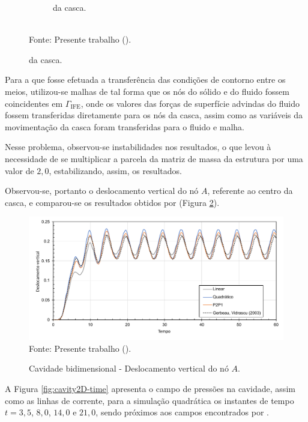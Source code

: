 \begin{figure}[h!]
\begin{subfigure}[b]{0.32\textwidth}
        \caption{da casca.}
    \end{subfigure}
    \\Fonte: Presente trabalho (\the\year).
    \label{fig:Cavity2D-mesh}
\end{figure}

Para a que fosse efetuada a transferência das condições de contorno entre os meios, utilizou-se malhas de tal forma que os nós do sólido e do fluido fossem coincidentes em $\Gamma_\mathrm{IFE}$, onde os valores das forças de superfície advindas do fluido fossem transferidas diretamente para os nós da casca, assim como as variáveis da movimentação da casca foram transferidas para o fluido e malha.

Nesse problema, observou-se instabilidades nos resultados, o que levou à necessidade de se multiplicar a parcela da matriz de massa da estrutura por uma valor de $2,0$, estabilizando, assim, os resultados.

Observou-se, portanto o deslocamento vertical do nó $A$, referente ao centro da casca, e comparou-se os resultados obtidos por  (Figura \ref{fig:cavity2D-res}).

\begin{figure}[h!]
    \centering
    \caption{Cavidade bidimensional - Deslocamento vertical do nó $A$.}
    \includegraphics[width=\linewidth]{Figuras/FSI-Cavity2D/resultados.pdf}
    \\Fonte: Presente trabalho (\the\year).
    \label{fig:cavity2D-res}
\end{figure}

A Figura \ref{fig:cavity2D-time} apresenta o campo de pressões na cavidade, assim como as linhas de corrente, para a simulação quadrática os instantes de tempo $t=3,5$, $8,0$, $14,0$ e $21,0$, sendo próximos aos campos encontrados por .

